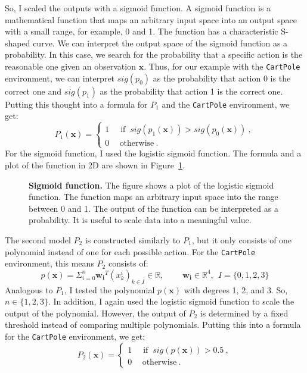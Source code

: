 So, I scaled the outputs with a sigmoid function. A sigmoid function is a mathematical function that maps an arbitrary input space into an output space with a small range, for example, 0 and 1. The function has a characteristic S-shaped curve. We can interpret the output space of the sigmoid function as a probability. In this case, we search for the probability that a specific action is the reasonable one given an observation $\mathbf{x}$. Thus, for our example with the \verb|CartPole| environment, we can interpret $sig(p_0)$ as the probability that action 0 is the correct one and $sig(p_1)$ as the probability that action 1 is the correct one. Putting this thought into a formula for $P_1$ and the \verb|CartPole| environment, we get:
\[
  P_1(\mathbf{x}) =
  \begin{cases}1~&{\text{ if }}~sig(p_1(\mathbf{x})) > sig(p_0(\mathbf{x}))~,\\0~&~\text{otherwise}~.\end{cases}
\]
For the sigmoid function, I used the logistic sigmoid function. The formula and a plot of the function in 2D are shown in Figure~\ref{fig:sigmoid}.
\begin{figure}[ht]
\centering
{}
\caption[Sigmoid function]{
  \textbf{Sigmoid function.}
  The figure shows a plot of the logistic sigmoid function. The function maps an arbitrary input space into the range between 0 and 1. The output of the function can be interpreted as a probability. It is useful to scale data into a meaningful value.
}
\label{fig:sigmoid}
\end{figure}

The second model $P_2$ is constructed similarly to $P_1$, but it only consists of one polynomial instead of one for each possible action. For the \verb|CartPole| environment, this means $P_2$ consists of:
\[
  p(\mathbf{x}) = \Sigma_{i=0}^{n} \mathbf{w_i}^T (x_k^i)_{k \in I} \in \mathbb{R}, \ \ \ \ \ \ \ \ \ \ \mathbf{w_i} \in \mathbb{R}^4, \ \ I = \{0, 1, 2, 3\}
\]
Analogous to $P_1$, I tested the polynomial $p(\mathbf{x})$ with degrees 1, 2, and 3. So, $n \in \{1, 2, 3\}$. In addition, I again used the logistic sigmoid function to scale the output of the polynomial. However, the output of $P_2$ is determined by a fixed threshold instead of comparing multiple polynomials. Putting this into a formula for the \verb|CartPole| environment, we get:
\[
  P_2(\mathbf{x}) =
  \begin{cases}1~&{\text{ if }}~sig(p(\mathbf{x}))>0.5~,\\0~&~\text{otherwise}~.\end{cases}
\]


